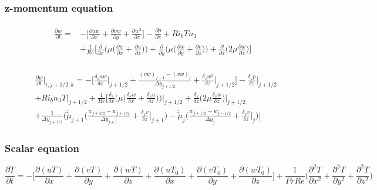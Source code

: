 \documentclass[preprint,12pt]{article}
\begin{document}
\subsubsection{z-momentum equation}
\begin{align}	\begin{split}
\frac{\partial w}{\partial t}=&-\Bigg[\frac{\partial uw}{\partial x}+\frac{\partial vw}{\partial y}+\frac{\partial w^2}{\partial z}\Bigg]-\frac{\partial p}{\partial z}+Ri_bT n_3\\&+\frac{1}{Re}\Bigg[\frac{\partial }{\partial x}\Bigg(\mu\Big(\frac{\partial w}{\partial x}+\frac{\partial u}{\partial z}\Big)\Bigg)+\frac{\partial }{\partial y}\Bigg(\mu\Big(\frac{\partial w}{\partial y}+\frac{\partial v}{\partial z}\Big)\Bigg)+\frac{\partial }{\partial z}\Bigg(2\mu\frac{\partial w}{\partial z}\Bigg)\Bigg]
\end{split}	\end{align}

\begin{align}	\begin{split}
&\frac{\partial w}{\partial t}\Bigg|_{i,j+1/2,k}=-\Bigg[\frac{\delta_s uw}{\delta x}\Bigg|_{j+1/2}+\frac{(v\bar{w})_{j+1}-(v\bar{w})_{j}}{\Delta y_{j+1/2}}+\frac{\delta_s 
	w^2}{\delta z}\Bigg|_{j+1/2}\Bigg]-\frac{\delta_s p}{\delta z}\Bigg|_{j+1/2}\\&+Ri_bn_3T|_{j+1/2} +\frac{1}{Re}\Bigg[\frac{\delta_s }{\delta x}\Bigg(\mu\Big(\frac{\delta_s w}{\delta x}+\frac{\delta_s u}{\delta z}\Big)\Bigg)\Bigg|_{j+1/2}+\frac{\delta_s }{\delta z}\Big(2\mu\frac{\delta_s w}{\delta z}\Big)\Bigg|_{j+1/2}\\&+\frac{1}{\Delta y_{j+1/2}}\Bigg(\check{\check{\mu}}_{j+1}\Bigg(\frac{w_{j+3/2}-w_{j+1/2}}{\Delta y_{j+1}}+\frac{\delta_s v}{\delta z}\Bigg|_{j+1}\Bigg)-\check{\check{\mu}}_{j}\Bigg(\frac{w_{j+1/2}-w_{j-1/2}}{\Delta y_{j}}+\frac{\delta_s v}{\delta z}\Bigg|_{j}\Bigg)\Bigg] 
\end{split}	\end{align} 

\subsubsection{Scalar equation}

\begin{equation}
\frac{\partial T}{\partial t}=-\Bigg[\frac{\partial (uT)}{\partial x}+\frac{\partial (vT)}{\partial y}+\frac{\partial (wT)}{\partial z}+\frac{\partial (u{T_0})}{\partial x}+\frac{\partial (v{T_0})}{\partial y}+\frac{\partial (w{T_0})}{\partial z}\Bigg]+\frac{1}{Pr Re} \Big(\frac{\partial^2 T}{\partial x^2}+\frac{\partial^2 T}{\partial y^2}+\frac{\partial^2 T}{\partial z^2}\Big)
\end{equation}
\end{document}
